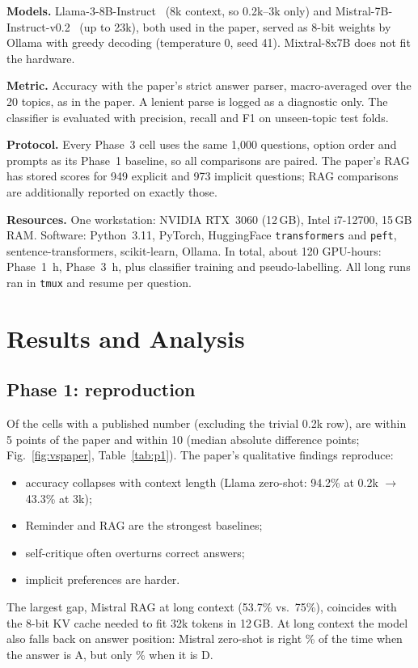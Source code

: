 \documentclass[lettersize,journal]{IEEEtran}
\begin{document}
\textbf{Models.} Llama-3-8B-Instruct~\cite{llama3} (8k context, so 0.2k--3k only) and Mistral-7B-Instruct-v0.2~\cite{mistral} (up to 23k), both used
in the paper, served as 8-bit weights by Ollama with greedy decoding (temperature 0, seed 41). Mixtral-8x7B does not fit the hardware.

\textbf{Metric.} Accuracy with the paper's strict answer parser, macro-averaged over the 20 topics, as in the paper. A lenient parse is logged as a
diagnostic only. The classifier is evaluated with precision, recall and F1 on unseen-topic test folds.

\textbf{Protocol.} Every Phase~3 cell uses the same 1{,}000 questions, option order and prompts as its Phase~1 baseline, so all comparisons are
paired. The paper's RAG has stored scores for 949 explicit and 973 implicit questions; RAG comparisons are additionally reported on exactly those.

\textbf{Resources.} One workstation: NVIDIA RTX~3060 (12\,GB), Intel i7-12700, 15\,GB RAM. Software: Python~3.11, PyTorch, HuggingFace
\texttt{transformers} and \texttt{peft}, sentence-transformers, scikit-learn, Ollama. In total, about 120 GPU-hours: Phase~1 \gpuHours\,h,
Phase~3 \qGpuHours\,h, plus classifier training and pseudo-labelling. All long runs ran in \texttt{tmux} and resume per question.

\section{Results and Analysis}

\subsection{Phase 1: reproduction}
Of the \nCompared{} cells with a published number (excluding the trivial 0.2k row), \nWithinFive{} are within 5 points of the paper and
\nWithinTen{} within 10 (median absolute difference \medianAbsDelta{} points; Fig.~\ref{fig:vspaper}, Table~\ref{tab:p1}). The paper's
qualitative findings reproduce:
\begin{itemize}
  \item accuracy collapses with context length (Llama zero-shot: 94.2\% at 0.2k $\rightarrow$ 43.3\% at 3k);
  \item Reminder and RAG are the strongest baselines;
  \item self-critique often overturns correct answers;
  \item implicit preferences are harder.
\end{itemize}
The largest gap, Mistral RAG at long context (53.7\% vs.\ 75\%), coincides with the 8-bit KV cache needed to fit 32k tokens in 12\,GB.
At long context the model also falls back on answer position: Mistral zero-shot is right \posAccAlong\% of the time when the answer is A,
but only \posAccDlong\% when it is D.
\end{document}
